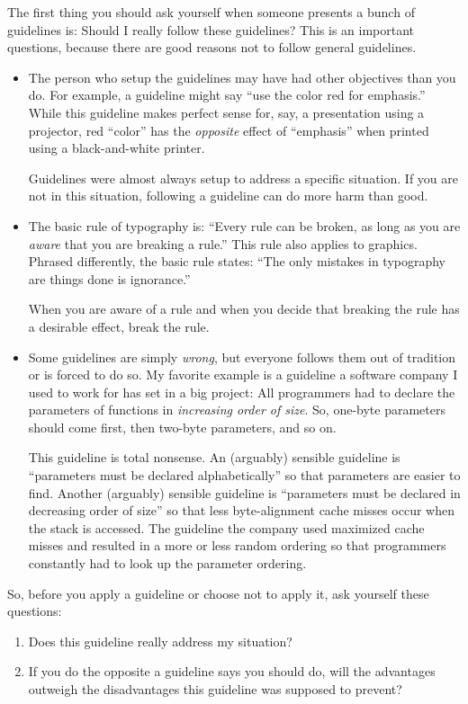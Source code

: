 The first thing you should ask yourself when someone presents a bunch of
guidelines is: Should I really follow these guidelines? This is an
important questions, because there are good reasons not to follow
general guidelines.
\begin{itemize}
\item
  The person who setup the guidelines may have had other
  objectives than you do. For example, a guideline might say ``use the
  color red for emphasis.'' While this guideline makes perfect sense
  for, say, a presentation using a projector, red ``color'' has the
  \emph{opposite} effect of ``emphasis'' when printed using a
  black-and-white printer.

  Guidelines were almost always setup to address a specific
  situation. If you are not in this situation, following a guideline
  can do more harm than good.
\item
  The basic rule of typography is: ``Every rule can be broken, as long
  as you are \emph{aware}  that you are breaking a rule.'' This rule
  also applies to graphics. Phrased differently, the basic rule
  states: ``The only mistakes in typography are things done is
  ignorance.''

  When you are aware of a rule and when you decide that breaking the
  rule has a desirable effect, break the rule.
\item
  Some guidelines are simply \emph{wrong}, but everyone follows them
  out of tradition or is forced to do so. My favorite example is a 
  guideline a software company I used to work for has set in a big
  project: All programmers had to declare the parameters of functions
  in \emph{increasing order of size}. So, one-byte
  parameters should come first, then two-byte parameters, and so on. 

  This guideline is total nonsense. An (arguably) sensible guideline
  is ``parameters must be declared alphabetically'' so that parameters
  are easier to find. Another (arguably) sensible guideline is
  ``parameters must be declared in decreasing order of size'' so that
  less byte-alignment cache misses occur when the stack is
  accessed. The guideline the company used maximized cache misses and
  resulted in a more or less random ordering so that programmers
  constantly had to look up the parameter ordering.
\end{itemize}

So, before you apply a guideline or choose not to apply it, ask
yourself these questions: 
\begin{enumerate}
\item
  Does this guideline really address my situation?
\item
  If you do the opposite a guideline says you should do, will the
  advantages outweigh the disadvantages this guideline was supposed to
  prevent?  
\end{enumerate}



